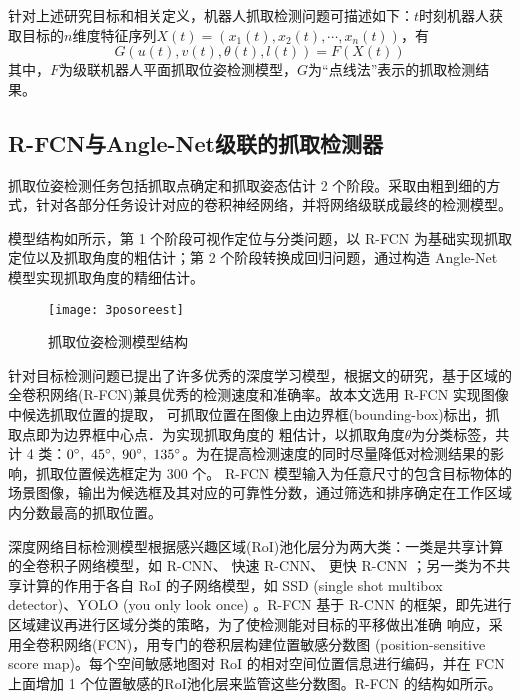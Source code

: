 \documentclass{yangthesis}
\begin{document}
针对上述研究目标和相关定义，机器人抓取检测问题可描述如下：$t$时刻机器人获取目标的$n$维度特征序列$X (t) = (x_1(t), x_2(t),\cdots, x_n(t))$，有
\begin{equation}
G(u(t), v(t), \theta(t), l(t)) = F(X (t))
\end{equation}
其中，$F$为级联机器人平面抓取位姿检测模型，$G$为“点线法”表示的抓取检测结果。

\subsection{R-FCN与Angle-Net级联的抓取检测器}

抓取位姿检测任务包括抓取点确定和抓取姿态估计 2 个阶段。采取由粗到细的方式，针对各部分任务设计对应的卷积神经网络，并将网络级联成最终的检测模型。

模型结构如所示，第 1 个阶段可视作定位与分类问题，以 R-FCN 为基础实现抓取定位以及抓取角度的粗估计；第 2 个阶段转换成回归问题，通过构造 Angle-Net 模型实现抓取角度的精细估计。

\begin{figure}[!htbp]
	\centering
	\texttt{[image: 3posoreest]}
	\caption{抓取位姿检测模型结构}
     \label{figpoe}
\end{figure}

针对目标检测问题已提出了许多优秀的深度学习模型，根据文的研究，基于区域的全卷积网络(R-FCN)兼具优秀的检测速度和准确率。故本文选用 R-FCN 实现图像中候选抓取位置的提取， 可抓取位置在图像上由边界框(bounding-box)标出，抓取点即为边界框中心点．为实现抓取角度的 粗估计，以抓取角度$\theta$为分类标签，共计 4 类：$0\degree,\ 45\degree,\ 90\degree,\ 135\degree$。为在提高检测速度的同时尽量降低对检测结果的影响，抓取位置候选框定为 300 个。 R-FCN 模型输入为任意尺寸的包含目标物体的场景图像，输出为候选框及其对应的可靠性分数，通过筛选和排序确定在工作区域内分数最高的抓取位置。

深度网络目标检测模型根据感兴趣区域(RoI)池化层分为两大类：一类是共享计算的全卷积子网络模型，如 R-CNN、 快速 R-CNN、 更快 R-CNN ；另一类为不共享计算的作用于各自 RoI 的子网络模型，如 SSD (single shot multibox detector)、YOLO (you only look once) 。R-FCN 基于 R-CNN 的框架，即先进行区域建议再进行区域分类的策略，为了使检测能对目标的平移做出准确 响应，采用全卷积网络(FCN)，用专门的卷积层构建位置敏感分数图 (position-sensitive score map)。每个空间敏感地图对 RoI 的相对空间位置信息进行编码，并在 FCN 上面增加 1 个位置敏感的RoI池化层来监管这些分数图。R-FCN 的结构如所示。
\end{document}
